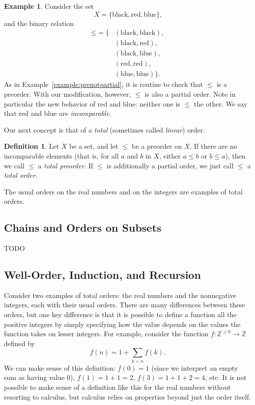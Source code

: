 \documentclass[letterpaper]{article}
\theoremstyle{definition}
\newtheorem{definition}[theorem]{Definition}
\newtheorem{example}[theorem]{Example}
\newcommand{\integers}{\mathbb{Z}}
\newcommand{\nnintegers}{{\integers^{\geq 0}}}
\begin{document}
\begin{example}
  \label{example:partialnotlinear}
  Consider the set
  \[X = \{\text{black}, \text{red}, \text{blue}\}\text{,}\]
  and the binary relation
  \begin{align*}
    \mathord{\leq} = \{
    &(\text{black}, \text{black}), \\
    &(\text{black}, \text{red}), \\
    &(\text{black}, \text{blue}), \\
    &(\text{red}, \text{red}), \\
    &(\text{blue}, \text{blue})
    \} \text{.}
  \end{align*}
  As in Example~\ref{example:prenotpartial}, it is routine to check
  that \(\leq\) is a preorder.  With our modification, however,
  \(\leq\) is also a partial order.  Note in particular the new
  behavior of red and blue: neither one is \(\leq\) the other.  We say
  that red and blue are \emph{incomparable}.
\end{example}

Our next concept is that of a \emph{total} (sometimes called
\emph{linear}) order.

\begin{definition}
  Let \(X\) be a set, and let \(\leq\) be a preorder on \(X\).  If
  there are no incomparable elements (that is, for all \(a\) and \(b\)
  in \(X\), either \(a \leq b\) or \(b \leq a\)), then we call
  \(\leq\) a \emph{total preorder}.  If \(\leq\) is additionally a
  partial order, we just call \(\leq\) a \emph{total order}.
\end{definition}

The usual orders on the real numbers and on the integers are examples
of total orders.

\subsection{Chains and Orders on Subsets}
TODO

\subsection{Well-Order, Induction, and Recursion}
Consider two examples of total orders: the real numbers and the
nonnegative integers, each with their usual orders.  There are many
differences between these orders, but one key difference is that it is
possible to define a function all the positive integers by simply
specifying how the value depends on the values the function takes on
lesser integers.  For example, consider the function \(f:\nnintegers
\to \integers\) defined by
\[ f(n) = 1+\sum_{k<n} f(k) \text{.} \]
We can make sense of this definition: \(f(0) = 1\) (since we interpret
an empty sum as having value 0), \(f(1) = 1+1 = 2\), \(f(3) = 1+1+2 =
4\), etc.  It is not possible to make sense of a definition like this
for the real numbers without resorting to calculus, but calculus
relies on properties beyond just the order itself.
\end{document}
